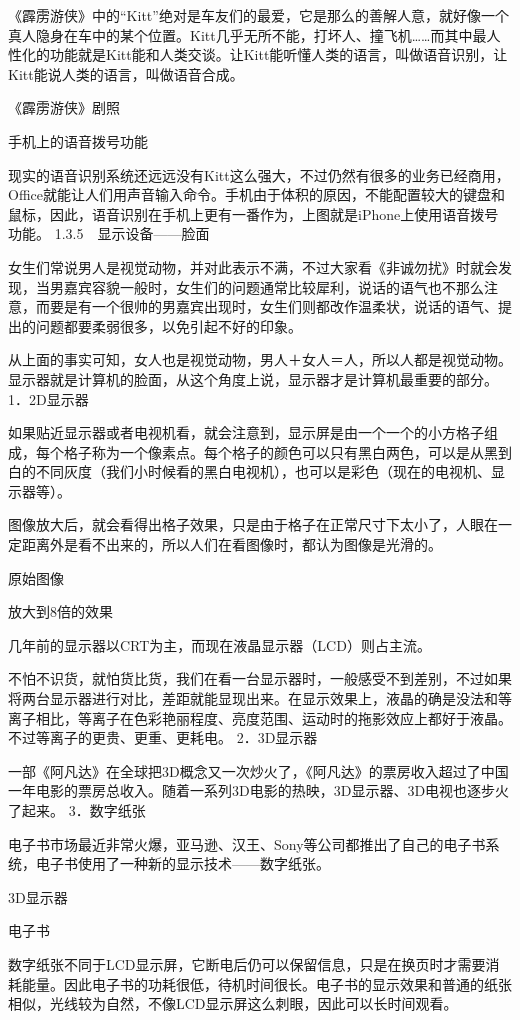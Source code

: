 \documentclass[12pt,UTF8]{ctexbook}
\begin{document}
《霹雳游侠》中的“Kitt”绝对是车友们的最爱，它是那么的善解人意，就好像一个真人隐身在车中的某个位置。Kitt几乎无所不能，打坏人、撞飞机……而其中最人性化的功能就是Kitt能和人类交谈。让Kitt能听懂人类的语言，叫做语音识别，让Kitt能说人类的语言，叫做语音合成。

《霹雳游侠》剧照

手机上的语音拨号功能

现实的语音识别系统还远远没有Kitt这么强大，不过仍然有很多的业务已经商用，Office就能让人们用声音输入命令。手机由于体积的原因，不能配置较大的键盘和鼠标，因此，语音识别在手机上更有一番作为，上图就是iPhone上使用语音拨号功能。
1.3.5　显示设备——脸面

女生们常说男人是视觉动物，并对此表示不满，不过大家看《非诚勿扰》时就会发现，当男嘉宾容貌一般时，女生们的问题通常比较犀利，说话的语气也不那么注意，而要是有一个很帅的男嘉宾出现时，女生们则都改作温柔状，说话的语气、提出的问题都要柔弱很多，以免引起不好的印象。

从上面的事实可知，女人也是视觉动物，男人＋女人＝人，所以人都是视觉动物。显示器就是计算机的脸面，从这个角度上说，显示器才是计算机最重要的部分。
1．2D显示器

如果贴近显示器或者电视机看，就会注意到，显示屏是由一个一个的小方格子组成，每个格子称为一个像素点。每个格子的颜色可以只有黑白两色，可以是从黑到白的不同灰度（我们小时候看的黑白电视机），也可以是彩色（现在的电视机、显示器等）。

图像放大后，就会看得出格子效果，只是由于格子在正常尺寸下太小了，人眼在一定距离外是看不出来的，所以人们在看图像时，都认为图像是光滑的。

原始图像

放大到8倍的效果

几年前的显示器以CRT为主，而现在液晶显示器（LCD）则占主流。

不怕不识货，就怕货比货，我们在看一台显示器时，一般感受不到差别，不过如果将两台显示器进行对比，差距就能显现出来。在显示效果上，液晶的确是没法和等离子相比，等离子在色彩艳丽程度、亮度范围、运动时的拖影效应上都好于液晶。不过等离子的更贵、更重、更耗电。
2．3D显示器

一部《阿凡达》在全球把3D概念又一次炒火了，《阿凡达》的票房收入超过了中国一年电影的票房总收入。随着一系列3D电影的热映，3D显示器、3D电视也逐步火了起来。
3．数字纸张

电子书市场最近非常火爆，亚马逊、汉王、Sony等公司都推出了自己的电子书系统，电子书使用了一种新的显示技术——数字纸张。

3D显示器

电子书

数字纸张不同于LCD显示屏，它断电后仍可以保留信息，只是在换页时才需要消耗能量。因此电子书的功耗很低，待机时间很长。电子书的显示效果和普通的纸张相似，光线较为自然，不像LCD显示屏这么刺眼，因此可以长时间观看。
\end{document}
